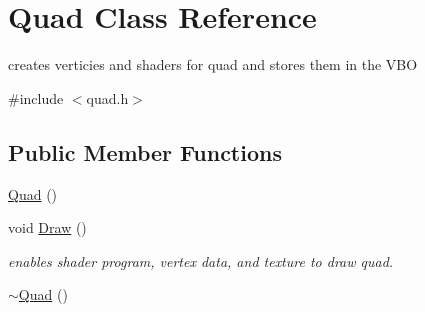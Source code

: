 \hypertarget{class_quad}{}\section{Quad Class Reference}
\label{class_quad}


creates verticies and shaders for quad and stores them in the V\+B\+O  




{\ttfamily \#include $<$quad.\+h$>$}

\subsection*{Public Member Functions}
\begin{DoxyCompactItemize}
\item 
\hyperlink{class_quad_ae446d188d645cc5c512336f25d1a697a}{Quad} ()
\item 
void \hyperlink{class_quad_a4febbb07741319565e1ee7abe8ab4674}{Draw} ()
\begin{DoxyCompactList}\small\item\em enables shader program, vertex data, and texture to draw quad. \end{DoxyCompactList}\item 
\hyperlink{class_quad_a5db77c0481b30c0b7c1014cc535284ad}{$\sim$\+Quad} ()
\end{DoxyCompactItemize}
